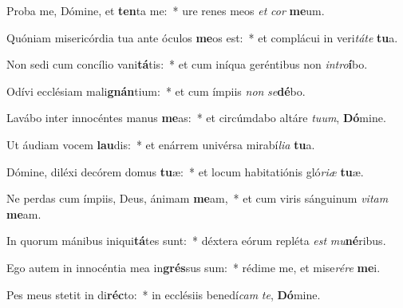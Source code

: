 \item Proba me, Dómine, et \textbf{ten}ta me:~* ure renes meos \textit{et} \textit{cor} \textbf{me}um.
\item Quóniam misericórdia tua ante óculos \textbf{me}os est:~* et complácui in veri\textit{tá}\textit{te} \textbf{tu}a.
\item Non sedi cum concílio vani\textbf{tá}tis:~* et cum iníqua geréntibus non \textit{in}\textit{tro}\textbf{í}bo.
\item Odívi ecclésiam mali\textbf{gnán}tium:~* et cum ímpiis \textit{non} \textit{se}\textbf{dé}bo.
\item Lavábo inter innocéntes manus \textbf{me}as:~* et circúmdabo altáre \textit{tu}\textit{um}, \textbf{Dó}mine.
\item Ut áudiam vocem \textbf{lau}dis:~* et enárrem univérsa mirabí\textit{li}\textit{a} \textbf{tu}a.
\item Dómine, diléxi decórem domus \textbf{tu}æ:~* et locum habitatiónis gló\textit{ri}\textit{æ} \textbf{tu}æ.
\item Ne perdas cum ímpiis, Deus, ánimam \textbf{me}am,~* et cum viris sánguinum \textit{vi}\textit{tam} \textbf{me}am.
\item In quorum mánibus iniqui\textbf{tá}tes sunt:~* déxtera eórum repléta \textit{est} \textit{mu}\textbf{né}ribus.
\item Ego autem in innocéntia mea in\textbf{grés}sus sum:~* rédime me, et mise\textit{ré}\textit{re} \textbf{me}i.
\item Pes meus stetit in di\textbf{réc}to:~* in ecclésiis benedí\textit{cam} \textit{te}, \textbf{Dó}mine.
